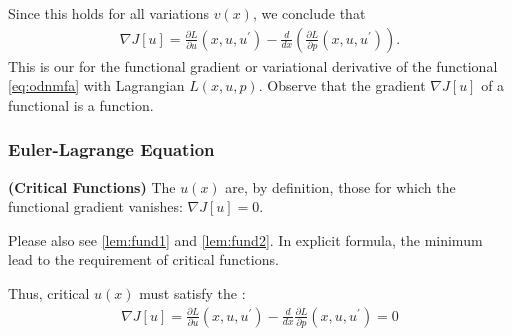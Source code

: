 \documentclass{article}
\newcommand{\bfs}[1]{\textbf{({#1}) }}
\begin{document}
Since this holds for all variations $v(x)$, we conclude that 
\begin{align}
\nabla J[u]=\frac{\partial L}{\partial u}\left(x, u, u^{\prime}\right)-\frac{d}{d x}\left(\frac{\partial L}{\partial p}\left(x, u, u^{\prime}\right)\right) .\label{eq:oidnfdaf}
\end{align}
This is our  for the functional gradient or variational derivative of the functional \cref{eq:odnmfa} with Lagrangian $L(x,u,p)$. Observe that the gradient $\nabla J[u]$ of a functional is a function.

\subsubsection{Euler-Lagrange Equation}
\begin{defa}\bfs{Critical Functions}
The  $u(x)$ are, by definition, those for which the functional gradient vanishes: $\nabla J[u]=0$.
\end{defa}
\begin{rema}
Please also see \cref{lem:fund1} and \cref{lem:fund2}. In explicit formula, the minimum lead to the requirement of critical functions.
\end{rema}
 Thus, critical $u(x)$ must satisfy the :
\begin{align}
\nabla J[u]=\frac{\partial L}{\partial u}\left(x, u, u^{\prime}\right)-\frac{d}{d x} \frac{\partial L}{\partial p}\left(x, u, u^{\prime}\right)=0\label{eq:ndcdfadf}
\end{align}
\end{document}
